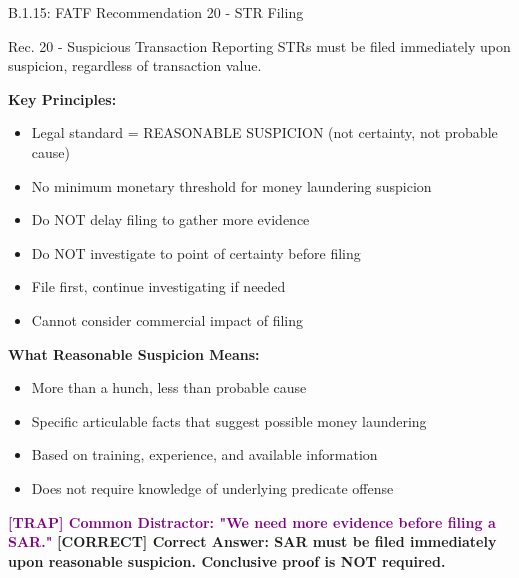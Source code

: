 \documentclass[11pt,a4paper]{beamer}
\newcommand{\trap}[1]{\textcolor{purple}{\textbf{[TRAP] #1}}}
\newcommand{\correct}[1]{\textcolor{green!50!black}{\textbf{[CORRECT] #1}}}
\begin{document}
	\begin{frame}{B.1.15: FATF Recommendation 20 - STR Filing}
		\begin{block}{Rec. 20 - Suspicious Transaction Reporting}
			STRs must be filed immediately upon suspicion, regardless of transaction value.
		\end{block}
		\textbf{Key Principles:}
		\begin{itemize}
			\item Legal standard = REASONABLE SUSPICION (not certainty, not probable cause)
			\item No minimum monetary threshold for money laundering suspicion
			\item Do NOT delay filing to gather more evidence
			\item Do NOT investigate to point of certainty before filing
			\item File first, continue investigating if needed
			\item Cannot consider commercial impact of filing
		\end{itemize}
		\textbf{What Reasonable Suspicion Means:}
		\begin{itemize}
			\item More than a hunch, less than probable cause
			\item Specific articulable facts that suggest possible money laundering
			\item Based on training, experience, and available information
			\item Does not require knowledge of underlying predicate offense
		\end{itemize}
		\trap{Common Distractor: "We need more evidence before filing a SAR."}
		\correct{Correct Answer: SAR must be filed immediately upon reasonable suspicion. Conclusive proof is NOT required.}
	\end{frame}
	
\end{document}
